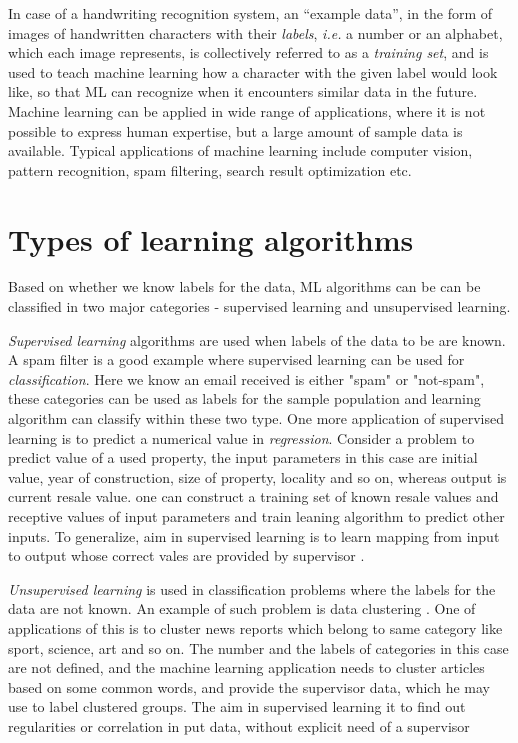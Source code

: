 In case of a handwriting recognition system, an \enquote{example data}, in the form of images of handwritten characters with their \emph{labels}, \emph{i.e.} a number or an alphabet, which each image represents, is collectively referred to as a \emph{training set}, and is used to teach machine learning how a character with the given label would look like, so that ML can recognize when it encounters similar data in the future. Machine learning can be applied in wide range of applications, where it is not possible to express human expertise, but a large amount of sample data is available. Typical applications of machine learning include computer vision, pattern recognition, spam filtering, search result optimization etc. 

\section{Types of learning algorithms}
\label{sec:secmltypes}
Based on whether we know labels for the data, ML algorithms can be can be classified in two major categories - supervised learning and unsupervised learning. 

\emph{Supervised learning} algorithms are used when labels of the data to be are known. A spam filter is a good example where supervised learning can be used for \emph{classification}. Here we know an email received is either "spam" or "not-spam", these categories can be used as labels for the sample population and learning algorithm can classify within these two type.  One more application of supervised learning is to predict a numerical value in \emph{regression}. Consider a problem to predict value of a used property, the input parameters in this case are initial value, year of construction, size of property, locality and so on, whereas output is current resale value. one can construct a training set of known resale values and receptive values of input parameters and train leaning algorithm to predict other inputs. To generalize, aim in supervised learning is to learn mapping from input to output whose correct vales are provided by supervisor \cite{Greene2008}.

\emph{Unsupervised learning} is used in classification problems where the labels for the data are not known. An example of such problem is data clustering \cite{Jain1988}. One of applications of this is to cluster news reports which belong to same category like sport, science, art and so on. The number and the labels of categories in this case are not defined, and the machine learning application needs to cluster articles based on some common words, and provide the supervisor data, which he may use to label clustered groups. The aim in supervised learning it to find out regularities or correlation in put data, without explicit need of a supervisor \cite{Marinai2008}

